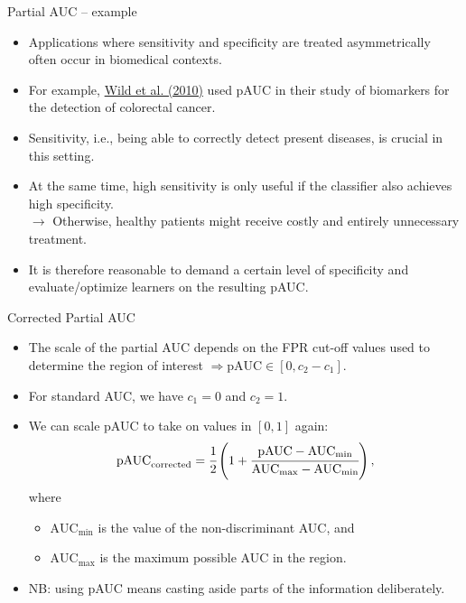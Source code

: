 
\begin{vbframe}{Partial AUC -- example}

\begin{itemize}
  \item Applications where sensitivity and specificity are treated 
  asymmetrically often occur in biomedical contexts.
  \item For example, 
  \href{https://clincancerres.aacrjournals.org/content/16/24/6111}
  {Wild et al. (2010)} used pAUC in their study of biomarkers for the detection 
  of colorectal cancer.
  \item Sensitivity, i.e., being able to correctly detect present diseases, is 
  crucial in this setting.
  \item At the same time, high sensitivity is only useful if the classifier also 
  achieves high specificity. \\
  $\rightarrow$ Otherwise, healthy patients might receive costly and entirely 
  unnecessary treatment.
  \item It is therefore reasonable to demand a certain level of specificity and 
  evaluate/optimize learners on the resulting pAUC.
\end{itemize}

\end{vbframe}


\begin{vbframe}{Corrected Partial AUC}

\begin{itemize}
  \item The scale of the partial AUC depends on the FPR cut-off values used to 
  determine the region of interest $\Rightarrow \text{pAUC} \in [0, c_2 - c_1]$.
  \item For standard AUC, we have $c_1 = 0$ and $c_2 = 1$.
  \item We can scale pAUC to take on values in $[0, 1]$ again:
  $$\text{pAUC}_\text{corrected} = \cfrac{1}{2} \left( 1 + \cfrac{\text{pAUC} - 
  \text{AUC}_{\text{min}}}{\text{AUC}_{\text{max}} - \text{AUC}_{\text{min}}} 
  \right),$$
  where
  \begin{itemize}
    \item $\text{AUC}_{\text{min}}$ is the value of the non-discriminant AUC, 
    and
    \item $\text{AUC}_{\text{max}}$ is the maximum possible AUC in the region.
  \end{itemize}
  \lz
  \item NB: using pAUC means casting aside parts of the information 
  deliberately.
\end{itemize}

\end{vbframe}

